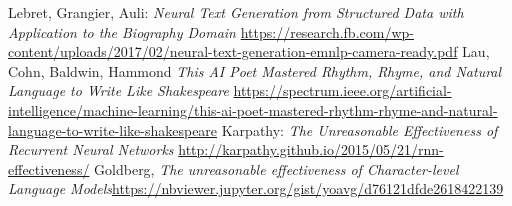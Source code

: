 \documentclass[a4paper, justified]{tufte-handout}
\begin{document}
\begin{thebibliography}{99}
 Lebret, Grangier, Auli: \emph{Neural Text Generation from Structured Data with Application to the Biography Domain} \url{https://research.fb.com/wp-content/uploads/2017/02/neural-text-generation-emnlp-camera-ready.pdf}
 Lau, Cohn, Baldwin, Hammond \emph{This AI Poet Mastered Rhythm, Rhyme, and Natural Language to Write Like Shakespeare} \url{https://spectrum.ieee.org/artificial-intelligence/machine-learning/this-ai-poet-mastered-rhythm-rhyme-and-natural-language-to-write-like-shakespeare}
 Karpathy: \emph{The Unreasonable Effectiveness of Recurrent Neural Networks} \url{http://karpathy.github.io/2015/05/21/rnn-effectiveness/}
 Goldberg, \emph{The unreasonable effectiveness of Character-level Language Models}\url{https://nbviewer.jupyter.org/gist/yoavg/d76121dfde2618422139}
\end{thebibliography}
\end{document}
